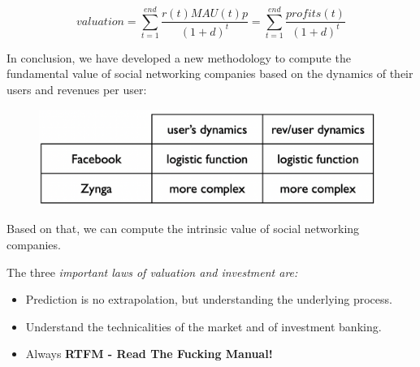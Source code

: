 \documentclass[a4paper]{extarticle}
\begin{document}
\[
    valuation = \sum_{t = 1}^{end} \frac{r(t)MAU(t)p}{(1 + d)^t} = \sum_{t = 1}^{end} \frac{profits(t)}{(1 + d)^t}
\]

In conclusion, we have developed a new methodology to compute the fundamental value of social networking companies based on the dynamics of their users and revenues per user:

\begin{figure}[H]
    \includegraphics[width=11cm]{../images/EnpRisk_Fig7-3}
    \centering
\end{figure}

Based on that, we can compute the intrinsic value of social networking companies.

The three \textit{important laws of valuation and investment are:}

\begin{itemize}
    \item Prediction is no extrapolation, but understanding the underlying process.
    \item Understand the technicalities of the market and of investment banking.
    \item Always \textbf{RTFM - Read The Fucking Manual!}
\end{itemize}
\end{document}
